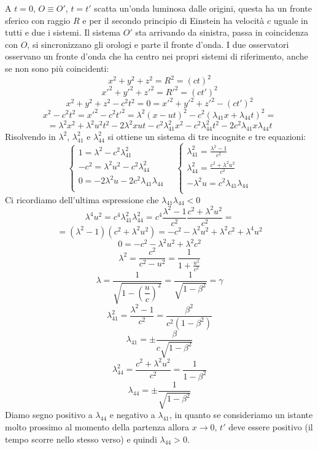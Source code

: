A $t=0$, $O\equiv O'$, $t=t'$ scatta un'onda luminosa dalle origini, questa ha un fronte sferico con raggio $R$ e per il secondo principio di Einstein ha velocità $c$ uguale in tutti e due i sistemi. Il sistema $O'$ sta arrivando da sinistra, passa in coincidenza con $O$, si sincronizzano gli orologi e parte il fronte d'onda. I due osservatori osservano un fronte d'onda che ha centro nei propri sistemi di riferimento, anche se non sono più coincidenti:
\[x^2+y^2+z^2=R^2=(ct)^2\]
\[x'^2+y'^2+z'^2=R'^2=(ct')^2\]
\[x^2+y^2+z^2-c^2t^2=0=x'^2+y'^2+z'^2-(ct')^2\]
\[x^2-c^2t^2=x'^2-c^2t'^2=\lambda^2(x-ut)^2-c^2(\lambda_{41}x+\lambda_{44}t)^2=\]
\[=\lambda^2x^2+\lambda^2 u^2t^2-2\lambda^2 xut-c^2\lambda_{41}^2x^2-c^2\lambda_{44}^2t^2-2c^2\lambda_{41} x\lambda_{44} t\]
Risolvendo in $\lambda^2$, $\lambda_{41}^2$ e $\lambda_{44}^2$ si ottiene un sistema di tre incognite e tre equazioni:
\[\left\{
   \begin{array}{l}
      1=\lambda^2-c^2\lambda_{41}^2               \\
      -c^2=\lambda^2u^2-c^2\lambda_{44}^2         \\
      0=-2\lambda^2u-2c^2\lambda_{41}\lambda_{44} \\
   \end{array}
   \right.\quad \left\{
   \begin{array}{l}
      \lambda_{41}^2=\frac{\lambda^2-1}{c^2}      \\
      \lambda_{44}^2=\frac{c^2+\lambda^2u^2}{c^2} \\
      -\lambda^2u=c^2\lambda_{41}\lambda_{44}     \\
   \end{array}\right.\]
Ci ricordiamo dell'ultima espressione che $\lambda_{41}\lambda_{44}<0$
\[\lambda^4u^2=c^4\lambda_{41}^2\lambda_{44}^2=c^4\frac{\lambda^2-1}{c^2}\frac{c^2+\lambda^2u^2}{c^2}=\]
\[=(\lambda^2-1)(c^2+\lambda^2u^2)=-c^2-\lambda^2u^2+\lambda^2c^2+\lambda^4u^2\]
\[0=-c^2-\lambda^2u^2+\lambda^2c^2\]
\[\lambda^2=\frac{c^2}{c^2-u^2}=\frac{1}{1+\frac{u^2}{c^2}}\]
\[\lambda=\dfrac{1}{\sqrt{1-\left(\dfrac{u}{c}\right)^2}}=\dfrac{1}{\sqrt{1-\beta^2}}=\gamma\]
\[\lambda_{41}^2=\frac{\lambda^2-1}{c^2}=\frac{\beta^2}{c^2(1-\beta^2)}\]
\[\lambda_{41}=\pm\frac{\beta}{c\sqrt{1-\beta^2}}\]
\[\lambda_{44}^2=\frac{c^2+\lambda^2u^2}{c^2}=\frac{1}{1-\beta^2}\]
\[\lambda_{44}=\pm\frac{1}{\sqrt{1-\beta^2}}\]
Diamo segno positivo a $\lambda_{44}$ e negativo a $\lambda_{41}$, in quanto se consideriamo un istante molto prossimo al momento della partenza allora $x\rightarrow 0$, $t'$ deve essere positivo (il tempo scorre nello stesso verso) e quindi $\lambda_{44}>0$.

